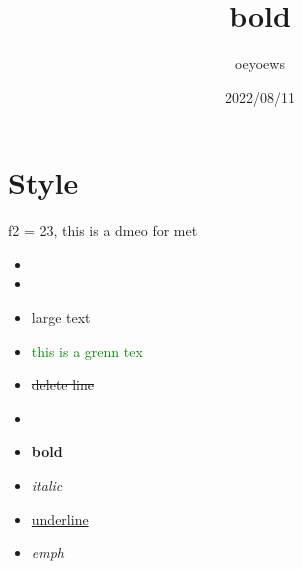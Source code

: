 \documentclass[UTF8]{article}
\title{bold}
\author{oeyoews}
\date{2022/08/11}
\begin{document}
\maketitle


\section{ Style}%
\label{sec:Style}

f2 = 23, this is a dmeo for met

\begin{itemize}
	\item {}
	\item {}
	\item \huge{large text}
	\item \textcolor{green}{this is a grenn tex}
	\item \sout{delete line}
	\item {}
	\item  \textbf{bold}
	\item \textit{italic}
	\item \underline{underline}
	      \item{\emph{emph}}
\end{itemize}
\end{document}
